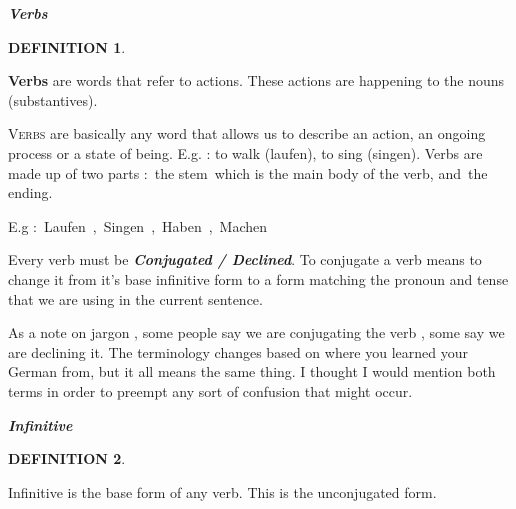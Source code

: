 \documentclass[a4paper,twocolumn,10pt]{article}
\newtheorem{mydef}{DEFINITION}[section]
\newcommand{\newpar}
{\par \vspace{0.3cm}}
\newcommand{\tcolorboxstart}
{
	\nolinenumbers
	\vspace{0.2cm}
	\centering
}
\newcommand{\tcolorboxend}
{
	\justifying
	\vspace{0.2cm}
	\linenumbers
}
\newcommand{\tcolorboxdefinition}[3]
{

\tcolorboxstart
\begin{defn-bg}

	\begin{defn-title}[width=7cm]{}
	{
		\normalsize \textbf{\textit{#1}}
	}
	\end{defn-title}

	\begin{defn-theword}
	{
		\footnotesize
		\begin{mydef} #2
		\end{mydef}
	}
	\end{defn-theword}


	\begin{defn-content}

	\justify
	#3

	\end{defn-content}

\end{defn-bg}
\tcolorboxend
}
\begin{document}

\vspace{0.2cm}
\centering
\nolinenumbers
\begin{defn-bg}

\label{def:verbs_infinitives}
	\begin{defn-title}[width=7cm]{}
		{\normalsize \textbf{\textit{Verbs}} }
	\end{defn-title}

	\begin{defn-theword}
	{
		\footnotesize \begin{mydef} \end{mydef}
	}
	\end{defn-theword}

	\begin{defn-content}
		\justify
	
\textbf {Verbs} are words that refer to actions. These actions are happening to
the nouns (substantives).

	\end{defn-content}

\end{defn-bg}

\justifying
\linenumbers


\lettrine[lines=3, findent=3pt, nindent=0pt]{V}{erbs} are basically any word that
allows us to describe an action, an ongoing process or a state of being. E.g. :
to walk (laufen), to sing (singen).  Verbs are made up of two parts : the
stem which is the main body of the verb, and the ending.\newpar

\noindent
E.g : Laufen , Singen , Haben , Machen\newpar

Every verb must be \textbf{\textit{Conjugated / Declined}}. To conjugate a verb
means to change it from it's base infinitive form to a form matching the pronoun
and tense that we are using in the current sentence.\newpar

As a note on jargon , some people say we are conjugating the verb , some say we
are declining it. The terminology changes based on where you learned your German
from, but it all means the same thing. I thought I would mention both terms in
order to preempt any sort of confusion that might occur. \newpar


\tcolorboxdefinition
{Infinitive}
{\label{def:infinitive}}
{

		Infinitive is the base form of any verb. This is the unconjugated form.

}
\end{document}
